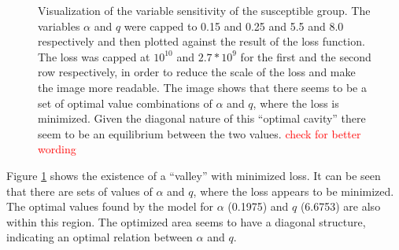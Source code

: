 \begin{figure}[h]
\begin{subfigure}[b]{0.4\textwidth}
	\end{subfigure}
	\caption{Visualization of the variable sensitivity of the susceptible group. The variables $\alpha$ and $q$ were
		capped to 0.15 and 0.25 and 5.5 and 8.0 respectively and then plotted against the result of the loss function.
		The loss was capped at $10^{10}$ and $2.7*10^{9}$ for the first and the second row respectively, in order to
		reduce the scale of the loss and make the image more readable. The image shows that there seems to be a set of
		optimal value combinations of $\alpha$ and $q$, where the loss is minimized. Given the diagonal nature of this
		``optimal cavity'' there seem to be an equilibrium between the two values.
		\textcolor{red}{check for better wording} %
		}
	\label{fig:sensitivity_zoom1}
\end{figure}

Figure \ref*{fig:sensitivity_zoom1} shows the existence of a ``valley'' with minimized loss. It can be seen that there are 
sets of values of $\alpha$ and $q$, where the loss appears to be minimized. The optimal values found by the model for $\alpha$
(0.1975) and $q$ (6.6753) are also within this region. The optimized area seems to have a diagonal structure,
indicating an optimal relation between $\alpha$ and $q$.

